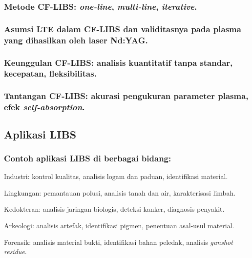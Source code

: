 \subsubsection{Metode CF-LIBS: \textit{one-line}, \textit{multi-line}, \textit{iterative}.}
\subsubsection{Asumsi LTE dalam CF-LIBS dan validitasnya pada plasma yang dihasilkan oleh laser Nd:YAG.}
\subsubsection{Keunggulan CF-LIBS: analisis kuantitatif tanpa standar, kecepatan, fleksibilitas.}
\subsubsection{Tantangan CF-LIBS: akurasi pengukuran parameter plasma, efek \textit{self-absorption}.}


\subsection{Aplikasi LIBS}

\subsubsection{Contoh aplikasi LIBS di berbagai bidang:}

\par Industri: kontrol kualitas, analisis logam dan paduan, identifikasi material.
\par Lingkungan: pemantauan polusi, analisis tanah dan air, karakterisasi limbah.
\par Kedokteran: analisis jaringan biologis, deteksi kanker, diagnosis penyakit.
\par Arkeologi: analisis artefak, identifikasi pigmen, penentuan asal-usul material.
\par Forensik: analisis material bukti, identifikasi bahan peledak, analisis \textit{gunshot residue}.
